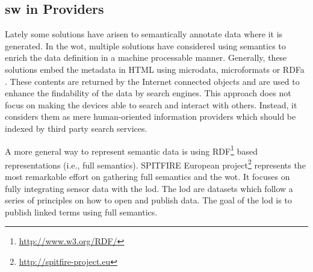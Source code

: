 
\subsection{\acs{sw} in Providers}
\label{sec:sw_providers}



Lately some solutions have arisen to semantically annotate data where it is generated. %
In the \acl{wot}, multiple solutions have considered using semantics to enrich the data definition in a machine processable manner.
Generally, these solutions embed the metadata in HTML using microdata, microformats or RDFa \citep{mayer_extensible_2011}.
These contents are returned by the Internet connected objects and are used to enhance the findability of the data by search engines.
This approach does not focus on making the devices able to search and interact with others.
Instead, it considers them as mere human-oriented information providers which should be indexed by third party search services.

A more general way to represent semantic data is using RDF\footnote{\url{http://www.w3.org/RDF/}} based representations (i.e., full semantics).
SPITFIRE European project\footnote{\url{http://spitfire-project.eu}} represents the most remarkable effort on gathering full semantics and the \ac{wot}.
It focuses on fully integrating sensor data with the \ac{lod}. 
The \ac{lod} are datasets which follow a series of principles on how to open and publish data.
The goal of the \ac{lod} is to publish linked terms using full semantics.

